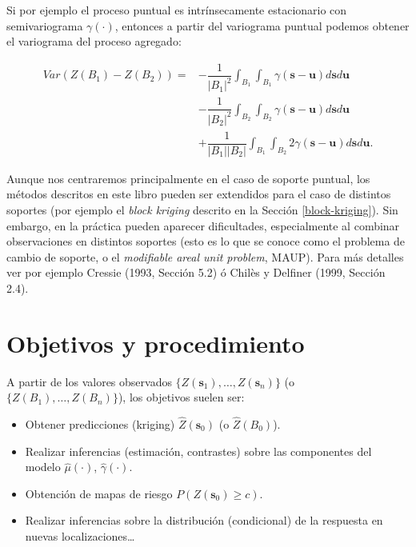 \documentclass[
]{book}
\theoremstyle{break}
\theoremstyle{definition}
\theoremstyle{definition}
\theoremstyle{definition}
\theoremstyle{definition}
\theoremstyle{remark}
\begin{document}
Si por ejemplo el proceso puntual es intrínsecamente estacionario con semivariograma \(\gamma (\cdot)\), entonces a partir del variograma puntual podemos obtener el variograma del proceso agregado:

\[\begin{aligned}
Var\left( Z(B_1)-Z(B_2)\right) = & -\dfrac{1}{\left| B_1 \right| ^{2} } 
\int_{B_1 }\int_{B_1 }\gamma(\mathbf{s}-\mathbf{u})d\mathbf{s}d\mathbf{u}   \\
  & -\dfrac{1}{\left| B_2 \right|^{2} } \int_{B_2}\int_{B_2}\gamma(\mathbf{s}-\mathbf{u})d\mathbf{s}d\mathbf{u}   \\
 & +\dfrac{1}{\left| B_1 \right| \left| B_2 \right| } \int_{B_1 }\int_{B_2} 2\gamma(\mathbf{s}-\mathbf{u})d\mathbf{s}d\mathbf{u}. 
\end{aligned}\]

Aunque nos centraremos principalmente en el caso de soporte puntual, los métodos descritos en este libro pueden ser extendidos para el caso de distintos soportes (por ejemplo el \emph{block kriging} descrito en la Sección \ref{block-kriging}).
Sin embargo, en la práctica pueden aparecer dificultades, especialmente al combinar observaciones en distintos soportes (esto es lo que se conoce como el problema de cambio de soporte, o el \emph{modifiable areal unit problem}, MAUP).
Para más detalles ver por ejemplo Cressie (1993, Sección 5.2) ó Chilès y Delfiner (1999, Sección 2.4).

\section{Objetivos y procedimiento}\label{objetivos-esquema}

A partir de los valores observados \(\{Z(\mathbf{s}_1), \ldots, Z(\mathbf{s}_n)\}\) (o \(\{Z(B_1), \ldots, Z(B_n)\}\)), los objetivos suelen ser:

\begin{itemize}
\item
  Obtener predicciones (kriging) \(\hat{Z}(\mathbf{s}_0)\) (o \(\hat{Z}(B_0)\)).
\item
  Realizar inferencias (estimación, contrastes) sobre las componentes
  del modelo \(\hat{\mu}(\cdot)\), \(\hat{\gamma}(\cdot)\).
\item
  Obtención de mapas de riesgo \(P({Z}(\mathbf{s}_0)\geq c)\).
\item
  Realizar inferencias sobre la distribución (condicional) de la respuesta
  en nuevas localizaciones\ldots{}
\end{itemize}
\end{document}
